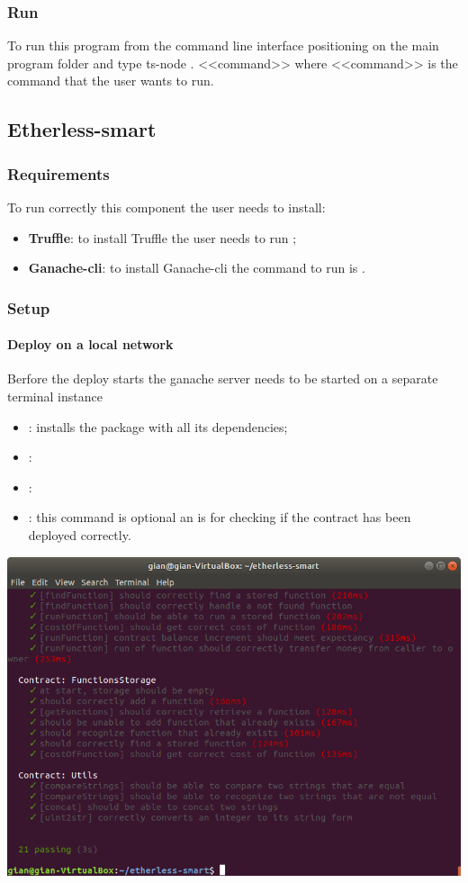 \subsubsection{Run}
To run this program from the command line interface positioning on the main program folder
and type ts-node . <<command>> where <<command>> is the command that the user wants to run.
\subsection{Etherless-smart}
\subsubsection{Requirements}
To run correctly this component the user needs to install:
\begin{itemize}
    \item \textbf{Truffle}: to install Truffle the user needs to run ;
    \item \textbf{Ganache-cli}: to install Ganache-cli the command to run is .
\end{itemize}

\subsubsection{Setup}
\paragraph{Deploy on a local network}
Berfore the deploy starts the ganache server needs to be started on a separate terminal instance 
\begin{itemize}
    \item {} : installs the package with all its dependencies;    
    \item {}:
    \item {}:
    \item {}: this command is optional an is for checking if the contract has been deployed correctly.
\end{itemize}
\includegraphics[width=\textwidth]{res/img/truffleTest.png}
